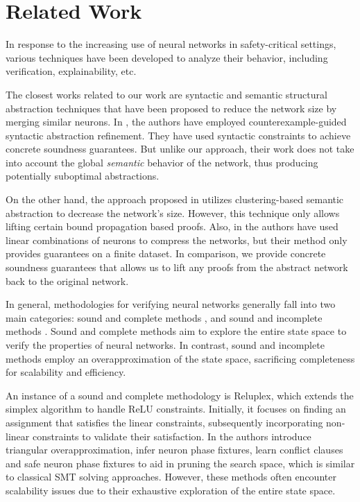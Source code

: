 \section{Related Work}

In response to the increasing use of neural networks in safety-critical settings, 
various techniques have been developed to analyze their behavior, including 
verification, explainability, etc. 

The closest works related to our work are 
syntactic and semantic structural abstraction techniques that
have been proposed to reduce the network size by merging similar neurons. 
In \cite {cegar-nn, cegarette}, the authors have 
employed counterexample-guided syntactic abstraction
refinement. They have used syntactic constraints to achieve concrete soundness
guarantees. But unlike our approach, their work does not take into account the
global \textit{semantic} behavior of the network, thus producing potentially
suboptimal abstractions.

On the other hand, the approach proposed in \cite{deep-abstract} utilizes
clustering-based semantic abstraction to decrease the network's size. 
However, this technique only allows lifting certain bound propagation
based proofs. Also, in \cite{lin-comb-abs-jan} the authors have used linear 
combinations of neurons to compress the networks, but their method only provides 
guarantees on a finite dataset. In comparison, we provide concrete soundness
guarantees that allows us to lift any proofs from the abstract 
network back to the original network.

In general, methodologies for verifying neural networks generally fall into two
main categories: sound and complete methods \cite{reluplex,
    formal-ver-piece-wise, 
comp-reachability-analysis, comp-milp, comp-out-range, comp-max-resilience, marabou,
comp-safety-ver-dnn, beta-crown, alpha-crown-bab-fnc, gcp-crown}, and sound and
incomplete methods \cite{deeppoly, crown, incomp-dual-approach, incomp-abs-inp, 
incomp-robustness-certi, incomp-boost-robustness}. Sound and complete methods aim to 
explore the entire state space to verify the properties of neural networks.
In contrast, sound and incomplete methods employ an overapproximation
of the state space, sacrificing completeness for 
scalability and efficiency.

An instance of a sound and complete methodology is Reluplex, which extends the 
simplex algorithm \cite{simplex} to 
handle ReLU constraints. Initially, it focuses on finding an assignment that 
satisfies the linear constraints, subsequently incorporating non-linear constraints 
to validate their satisfaction. In \cite{formal-ver-piece-wise}
the authors introduce triangular overapproximation, infer neuron phase fixtures,
learn conflict clauses and safe neuron phase fixtures to aid in pruning the search 
space, which is similar to classical SMT solving approaches. However, these methods
often encounter scalability issues due to their exhaustive exploration of the
entire state space. 

